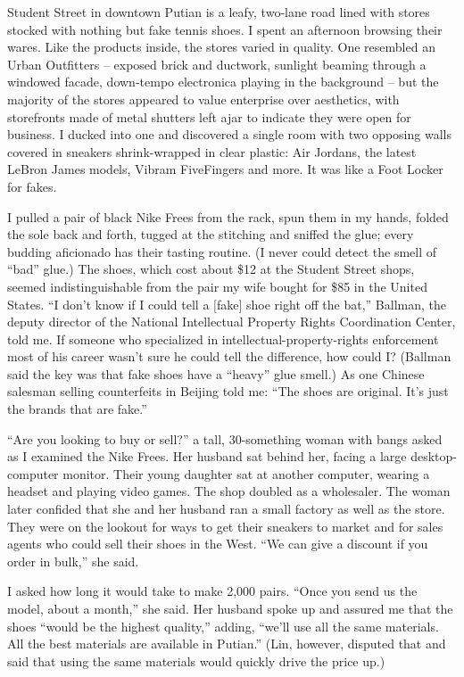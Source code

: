 ﻿\documentclass[12pt]{article}
\begin{document}
Student Street in downtown Putian is a leafy, two-lane road lined with stores stocked with nothing
but fake tennis shoes. I spent an afternoon browsing their wares. Like the products inside, the
stores varied in quality. One resembled an Urban Outfitters -- exposed brick and ductwork, sunlight
beaming through a windowed facade, down-tempo electronica playing in the background -- but the
majority of the stores appeared to value enterprise over aesthetics, with storefronts made of metal
shutters left ajar to indicate they were open for business. I ducked into one and discovered a
single room with two opposing walls covered in sneakers shrink-wrapped in clear plastic: Air
Jordans, the latest LeBron James models, Vibram FiveFingers and more. It was like a Foot Locker for
fakes.

I pulled a pair of black Nike Frees from the rack, spun them in my hands, folded the sole back and
forth, tugged at the stitching and sniffed the glue; every budding aficionado has their tasting
routine. (I never could detect the smell of ``bad'' glue.) The shoes, which cost about \$12 at the
Student Street shops, seemed indistinguishable from the pair my wife bought for \$85 in the United
States. ``I don't know if I could tell a $[$fake$]$ shoe right off the bat,'' Ballman, the deputy
director of the National Intellectual Property Rights Coordination Center, told me. If someone who
specialized in intellectual-property-rights enforcement most of his career wasn't sure he could tell
the difference, how could I? (Ballman said the key was that fake shoes have a ``heavy'' glue smell.)
As one Chinese salesman selling counterfeits in Beijing told me: ``The shoes are original. It's just
the brands that are fake.''

``Are you looking to buy or sell?'' a tall, 30-something woman with bangs asked as I examined the
Nike Frees. Her husband sat behind her, facing a large desktop-computer monitor. Their young
daughter sat at another computer, wearing a headset and playing video games. The shop doubled as a
wholesaler. The woman later confided that she and her husband ran a small factory as well as the
store. They were on the lookout for ways to get their sneakers to market and for sales agents who
could sell their shoes in the West. ``We can give a discount if you order in bulk,'' she said.

I asked how long it would take to make 2,000 pairs. ``Once you send us the model, about a month,''
she said. Her husband spoke up and assured me that the shoes ``would be the highest quality,''
adding, ``we'll use all the same materials. All the best materials are available in Putian.'' (Lin,
however, disputed that and said that using the same materials would quickly drive the price up.)
\end{document}
